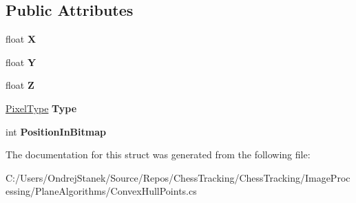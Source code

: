 \subsection*{Public Attributes}
\begin{DoxyCompactItemize}
\item 
\mbox{\label{struct_chess_tracking_1_1_image_processing_1_1_plane_algorithms_1_1_convex_hull_points_a9095d3a16a7b297b408ad479f1748e4c}} 
float {\bfseries X}
\item 
\mbox{\label{struct_chess_tracking_1_1_image_processing_1_1_plane_algorithms_1_1_convex_hull_points_a17143e2919505f74661eb3efab4d802a}} 
float {\bfseries Y}
\item 
\mbox{\label{struct_chess_tracking_1_1_image_processing_1_1_plane_algorithms_1_1_convex_hull_points_a05c85db7aea826ca34df82c4924b5d64}} 
float {\bfseries Z}
\item 
\mbox{\label{struct_chess_tracking_1_1_image_processing_1_1_plane_algorithms_1_1_convex_hull_points_a7ddffa07c97b3c3e246b86abcf1ab861}} 
\mbox{\hyperlink{namespace_chess_tracking_1_1_image_processing_1_1_plane_algorithms_ac44a3bcaafd35137cad84c4d148194c1}{Pixel\+Type}} {\bfseries Type}
\item 
\mbox{\label{struct_chess_tracking_1_1_image_processing_1_1_plane_algorithms_1_1_convex_hull_points_a032c778c0fd80f4d070dcbbc46ed8072}} 
int {\bfseries Position\+In\+Bitmap}
\end{DoxyCompactItemize}


The documentation for this struct was generated from the following file\+:\begin{DoxyCompactItemize}
\item 
C\+:/\+Users/\+Ondrej\+Stanek/\+Source/\+Repos/\+Chess\+Tracking/\+Chess\+Tracking/\+Image\+Processing/\+Plane\+Algorithms/Convex\+Hull\+Points.\+cs\end{DoxyCompactItemize}

